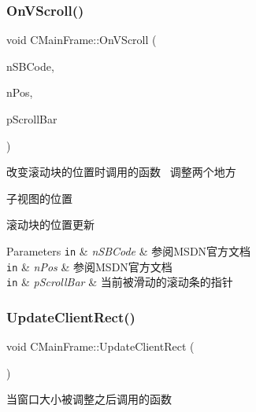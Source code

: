 \subsubsection{\texorpdfstring{On\+V\+Scroll()}{OnVScroll()}}
{\footnotesize\ttfamily void C\+Main\+Frame\+::\+On\+V\+Scroll (\begin{DoxyParamCaption}\item[{U\+I\+NT}]{n\+S\+B\+Code,  }\item[{U\+I\+NT}]{n\+Pos,  }\item[{C\+Scroll\+Bar $\ast$}]{p\+Scroll\+Bar }\end{DoxyParamCaption})}



改变滚动块的位置时调用的函数~\newline
调整两个地方~\newline



\begin{DoxyItemize}
\item 子视图的位置
\item 滚动块的位置更新 
\begin{DoxyParams}[1]{Parameters}
\mbox{\tt in}  & {\em n\+S\+B\+Code} & 参阅\+M\+S\+D\+N官方文档 \\
\hline
\mbox{\tt in}  & {\em n\+Pos} & 参阅\+M\+S\+D\+N官方文档 \\
\hline
\mbox{\tt in}  & {\em p\+Scroll\+Bar} & 当前被滑动的滚动条的指针 \\
\hline
\end{DoxyParams}

\end{DoxyItemize}\mbox{\label{class_c_main_frame_a2500e3a6ace77e01430f5ff4b9a6f182}} 
\subsubsection{\texorpdfstring{Update\+Client\+Rect()}{UpdateClientRect()}}
{\footnotesize\ttfamily void C\+Main\+Frame\+::\+Update\+Client\+Rect (\begin{DoxyParamCaption}{ }\end{DoxyParamCaption})}



当窗口大小被调整之后调用的函数~\newline



